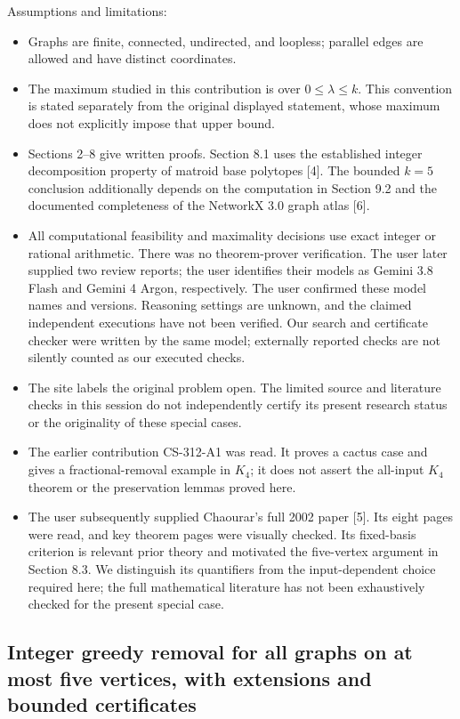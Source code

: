 \documentclass{article}
\begin{document}
Assumptions and limitations:

\begin{itemize}
\item
  Graphs are finite, connected, undirected, and loopless; parallel edges are allowed and have distinct coordinates.
\item
  The maximum studied in this contribution is over \(0\le\lambda\le k\). This convention is stated separately from the original displayed statement, whose maximum does not explicitly impose that upper bound.
\item
  Sections 2--8 give written proofs. Section 8.1 uses the established integer decomposition property of matroid base polytopes [4]. The bounded \(k=5\) conclusion additionally depends on the computation in Section 9.2 and the documented completeness of the NetworkX 3.0 graph atlas [6].
\item
  All computational feasibility and maximality decisions use exact integer or rational arithmetic. There was no theorem-prover verification. The user later supplied two review reports; the user identifies their models as Gemini 3.8 Flash and Gemini 4 Argon, respectively. The user confirmed these model names and versions. Reasoning settings are unknown, and the claimed independent executions have not been verified. Our search and certificate checker were written by the same model; externally reported checks are not silently counted as our executed checks.
\item
  The site labels the original problem open. The limited source and literature checks in this session do not independently certify its present research status or the originality of these special cases.
\item
  The earlier contribution CS-312-A1 was read. It proves a cactus case and gives a fractional-removal example in \(K_4\); it does not assert the all-input \(K_4\) theorem or the preservation lemmas proved here.
\item
  The user subsequently supplied Chaourar's full 2002 paper [5]. Its eight pages were read, and key theorem pages were visually checked. Its fixed-basis criterion is relevant prior theory and motivated the five-vertex argument in Section 8.3. We distinguish its quantifiers from the input-dependent choice required here; the full mathematical literature has not been exhaustively checked for the present special case.
\end{itemize}

\subsection{Integer greedy removal for all graphs on at most five vertices, with extensions and bounded certificates}
\end{document}
